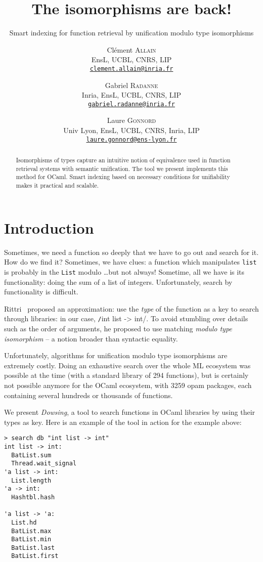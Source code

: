 \documentclass [a4paper,11pt] {scrartcl}
\title {The isomorphisms are back!}
\subtitle {Smart indexing for function retrieval by unification modulo type isomorphisms}
\author {
    Clément \textsc {Allain} \\
    EnsL, UCBL, CNRS, LIP \\
    \href {mailto:clement.allain@inria.fr}
    {\nolinkurl {clement.allain@inria.fr}}
  \and
  \and
    Gabriel \textsc {Radanne} \\
    Inria, EnsL, UCBL, CNRS, LIP \\
    \href {mailto:gabriel.radanne@inria.fr}
    {\nolinkurl {gabriel.radanne@inria.fr}}
  \and
    Laure \textsc {Gonnord} \\
    Univ Lyon, EnsL, UCBL, CNRS, Inria, LIP \\
    \href {mailto:laure.gonnord@ens-lyon.fr}
    {\nolinkurl {laure.gonnord@ens-lyon.fr}}
}
\date {}
\newcommand {\dowsing} {\textit {Dowsing}\xspace}
\begin{document}
\maketitle


\begin {abstract}
  Isomorphisms of types capture an intuitive notion of equivalence used in function retrieval systems with semantic unification. The tool we present implements this method for OCaml. Smart indexing based on necessary conditions for unifiability makes it practical and scalable.
\end {abstract}


\section {Introduction}

Sometimes, we need a function so deeply that we have to go out and search for it.
How do we find it? Sometimes, we have clues: a function which manipulates \texttt{list} is probably
in the \texttt{List} modulo \dots but not always!
Sometime, all we have is its functionality: doing the sum of a list of integers.
Unfortunately, search by functionality is difficult.

Rittri~\cite{rittri} proposed an approximation: use the \emph{type} of the function as a key
to search through libraries: in our case, \texttt/int list -> int/.
To avoid stumbling over details such
as the order of arguments, he proposed to use matching \emph{modulo type isomorphism} --
a notion broader than syntactic equality.

Unfortunately, algorithms for unification modulo type isomorphisms are extremely
costly. Doing an exhaustive search over the whole ML ecosystem
was possible at the time (with a standard library of 294 functions),
but is certainly not possible anymore for the OCaml ecosystem,
with 3259 opam packages, each containing several hundreds or thousands of
functions.

We present \dowsing, a tool to search functions in OCaml libraries by
using their types as key.
Here is an example of the tool in action for the example above:

\begin{lstlisting}[multicols=2]
> search db "int list -> int"
int list -> int:
  BatList.sum
  Thread.wait_signal
'a list -> int:
  List.length
'a -> int:
  Hashtbl.hash
  
'a list -> 'a:
  List.hd
  BatList.max
  BatList.min
  BatList.last
  BatList.first
\end{lstlisting}
\end{document}
